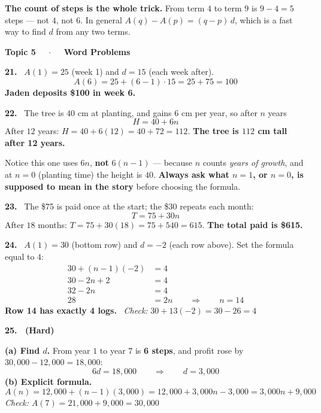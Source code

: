 \documentclass[11pt]{article}
\newcommand{\ans}[1]{\boxed{#1}}
\newcommand{\vans}[1]{\textbf{\textcolor{ink}{#1}}}
\newcommand{\keyhead}[1]{%
  \par\vspace{9pt}\noindent
  \begin{tcolorbox}[colback=violet!12,colframe=violet,arc=2pt,boxrule=0pt,
    leftrule=3.2pt,left=8pt,right=8pt,top=3pt,bottom=3pt]
  {\color{violet}\bfseries #1}
  \end{tcolorbox}\par\vspace{2pt}}
\begin{document}
\begin{notebox}
\textbf{The count of steps is the whole trick.} From term $4$ to term $9$ is $9-4=5$ steps ---
not $4$, not $6$. In general $A(q)-A(p)=(q-p)\,d$, which is a fast way to find $d$ from any two
terms.
\end{notebox}

\keyhead{Topic 5 \ \ $\cdot$ \ \ Word Problems}

\textbf{21.} \ $A(1)=25$ (week 1) and $d=15$ (each week after).
\[
A(6)=25+(6-1)\cdot15=25+75=100
\]
\vans{Jaden deposits \$100 in week 6.}

\vspace{4pt}
\textbf{22.} \ The tree is $40$ cm at planting, and gains $6$ cm per year, so after $n$ years
\[
\ans{H=40+6n}
\]
After $12$ years: $H=40+6(12)=40+72=112$.
\vans{The tree is $112$ cm tall after 12 years.}

\begin{notebox}
Notice this one uses $6n$, \textbf{not} $6(n-1)$ --- because $n$ counts \emph{years of growth},
and at $n=0$ (planting time) the height is $40$. \vans{Always ask what $n=1$, or $n=0$, is
supposed to mean in the story} before choosing the formula.
\end{notebox}

\vspace{3pt}
\textbf{23.} \ The \$75 is paid once at the start; the \$30 repeats each month:
\[
\ans{T=75+30n}
\]
After $18$ months: $T=75+30(18)=75+540=615$.
\vans{The total paid is \$615.}

\vspace{4pt}
\textbf{24.} \ $A(1)=30$ (bottom row) and $d=-2$ (each row above). Set the formula equal to $4$:
\begin{align*}
30+(n-1)(-2) &= 4\\
30-2n+2 &= 4\\
32-2n &= 4\\
28 &= 2n \qquad\Longrightarrow\qquad n=14
\end{align*}
\vans{Row 14 has exactly 4 logs.}
\ \emph{Check:} $30+13(-2)=30-26=4$ 

\vspace{5pt}
\textbf{25. \ (Hard)}

\vspace{2pt}
\textbf{(a) Find $d$.} From year $1$ to year $7$ is \textbf{6 steps}, and profit rose by
$30{,}000-12{,}000=18{,}000$:
\[
6d=18{,}000 \qquad\Longrightarrow\qquad \ans{d=3{,}000}
\]
\textbf{(b) Explicit formula.}
\[
A(n)=12{,}000+(n-1)(3{,}000)=12{,}000+3{,}000n-3{,}000=\ans{3{,}000n+9{,}000}
\]
\emph{Check:} $A(7)=21{,}000+9{,}000=30{,}000$ 
\end{document}
